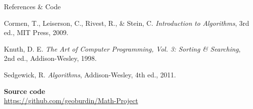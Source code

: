 \documentclass[aspectratio=169]{beamer}
\begin{document}
\begin{frame}{References \& Code}

  \footnotesize                       %
  \begin{thebibliography}{99}         %
    Cormen, T., Leiserson, C., Rivest, R., & Stein, C.
    \emph{Introduction to Algorithms}, 3rd ed., MIT Press, 2009.

    Knuth, D. E.
    \emph{The Art of Computer Programming, Vol. 3: Sorting & Searching},
    2nd ed., Addison-Wesley, 1998.

    Sedgewick, R.
    \emph{Algorithms}, Addison-Wesley, 4th ed., 2011.
  \end{thebibliography}

  \vspace{1ex}
  \textbf{Source code}\\
  \href{https://github.com/geoburdin/Math-Project}{%
        https://github.com/geoburdin/Math-Project}
\end{frame}
\end{document}
